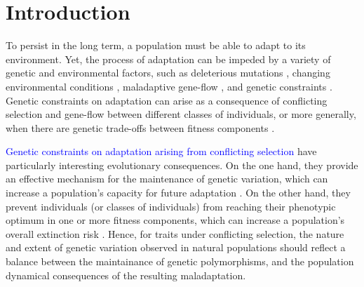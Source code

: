 \documentclass[11pt]{article}
\begin{document}
\newpage{}

\section*{Introduction}


To persist in the long term, a population must be able to adapt to its environment. Yet, the process of adaptation can be impeded by a variety of genetic and environmental factors, such as deleterious mutations \citep{Haldane1937}, changing environmental conditions \citep{Maynard-Smith1976, LandeShannon1996,OrrUnckless2008}, maladaptive gene-flow \citep{KirkpatrickBarton1997, BolnickNosil2007}, and genetic constraints \citep{ConnallonHall2018, MatthewsConnallon2019}. Genetic constraints on adaptation can arise as a consequence of conflicting selection and gene-flow between different classes of individuals, or more generally, when there are genetic trade-offs between fitness components \citep{CharlesworthHughes2000, ConnallonHall2018}. 

\textcolor{blue}{Genetic constraints on adaptation arising from conflicting selection} have particularly interesting evolutionary consequences. On the one hand, they provide an effective mechanism for the maintenance of genetic variation, which can increase a population's capacity for future adaptation \citep{Fisher1930, CharlesworthHughes2000, ConnallonHall2018, MatthewsConnallon2019}. On the other hand, they prevent individuals (or classes of individuals) from reaching their phenotypic optimum in one or more fitness components, which can increase a population's overall extinction risk \citep{kokko2003sexy,harts2014demography}. Hence, for traits under conflicting selection, the nature and extent of genetic variation observed in natural populations should reflect a balance between the maintainance of genetic polymorphisms, and the population dynamical consequences of the resulting maladaptation.
\end{document}
